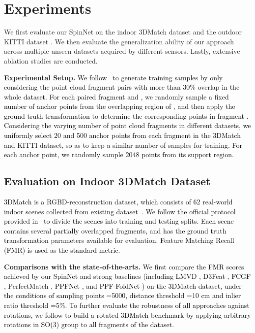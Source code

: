 \documentclass[final]{cvpr}
\newcommand{\qy}[1]{\textcolor{black}{#1}}
\newcommand{\nickname}{SpinNet}
\begin{document}
\section{Experiments}
\label{Experiments}

We first evaluate our \nickname{} on the indoor 3DMatch dataset \cite{Zeng2017}  and the outdoor KITTI dataset \cite{geiger2012we}. We then evaluate the generalization ability of our approach across multiple unseen datasets \cite{Zeng2017, geiger2012we, pomerleau2012challenging} acquired by different sensors. Lastly, extensive ablation studies are conducted.

\textbf{Experimental Setup.} \qy{We follow~\cite{bai2020d3feat, Zeng2017} to generate training samples by only considering the point cloud fragment pairs with more than 30\% overlap in the whole dataset. For each paired fragment  and , we randomly sample a fixed number of anchor points from the overlapping region of , and then apply the ground-truth transformation  to determine the corresponding points in fragment . Considering the varying number of point cloud fragments in different datasets, we uniformly select 20 and 500 anchor points from each fragment in the 3DMatch and KITTI dataset, so as to keep a similar number of samples for training. For each anchor point, we randomly sample 2048 points from its support region. }





 
\subsection{Evaluation on Indoor 3DMatch Dataset}
\label{Ex:3dmatch}

\qy{3DMatch is a RGBD-reconstruction dataset, which consists of 62 real-world indoor scenes collected from existing dataset~\cite{valentin2016learning, shotton2013scene, xiao2013sun3d, kim2014shape2pose, valentin2016learning, dai2017bundlefusion}. We follow the official protocol provided in~\cite{bai2020d3feat} to divide the scenes into training and testing splits. Each scene contains several partially overlapped fragments, and has the ground truth transformation parameters available for evaluation. Feature Matching Recall (FMR) \cite{Deng2018a} is used as the standard metric.
}

\smallskip\noindent\textbf{Comparisons with the state-of-the-arts.} \qy{ We first compare the FMR scores achieved by our \nickname{} and strong baselines (including LMVD \cite{li2020end}, D3Feat \cite{bai2020d3feat}, FCGF \cite{choy2019fully}, PerfectMatch \cite{Gojcic2019}, PPFNet \cite{Deng2018}, and PPF-FoldNet \cite{Deng2018a}) on the 3DMatch dataset, under the conditions of sampling points =5000, distance threshold =10 cm and inlier ratio threshold =5\%. To further evaluate the robustness of all approaches against rotations, we follow \cite{Deng2018, bai2020d3feat} to build a rotated 3DMatch benchmark by applying arbitrary rotations in SO(3) group to all fragments of the dataset. 
}
\end{document}
